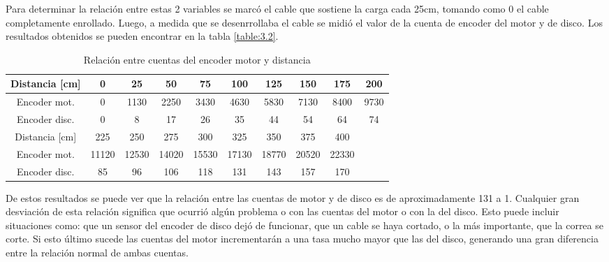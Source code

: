 Para determinar la relación entre estas 2 variables se marcó el cable que sostiene la carga cada 25cm, tomando como 0 el cable completamente enrollado. Luego, a medida que se desenrrollaba el cable se midió el valor de la cuenta de encoder del motor y de disco. Los resultados obtenidos se pueden encontrar en la tabla \ref{table:3.2}.

\begin{table}[!ht]
	\begin{center}
		
		\begin{tabular}{|c|c|c|c|c|c|c|c|c|c|}
			\hline
			\rowcolor{OODlightblue}
			Distancia [cm] & 0 & 25 & 50 & 75 & 100 & 125 & 150 & 175 & 200  \\
			\hline
			Encoder mot. & 0 & 1130 & 2250 & 3430 & 4630 & 5830 & 7130 & 8400 & 9730 \\
			\hline
			Encoder disc. & 0 & 8 & 17 & 26 & 35 & 44 & 54 & 64 & 74 \\ 
			\hline \hline
			\rowcolor{OODlightblue}
			Distancia [cm]  & 225 & 250 & 275 & 300 & 325 & 350 & 375 & 400 & \\
			\hline
			Encoder mot. & 11120 & 12530 & 14020 & 15530 & 17130 & 18770 & 20520 & 22330 & \\
			\hline 
			Encoder disc. & 85 & 96 & 106 & 118 & 131 & 143 & 157 & 170 & \\ 
			\hline
		\end{tabular}
	\end{center}
	\caption{Relación entre cuentas del encoder motor y distancia}
	\label{table:\thetable}
\end{table}

De estos resultados se puede ver que la relación entre las cuentas de motor y de disco es de aproximadamente 131 a 1. Cualquier gran desviación de esta relación significa que ocurrió algún problema o con las cuentas del motor o con la del disco. Esto puede incluir situaciones como: que un sensor del encoder de disco dejó de funcionar, que un cable se haya cortado, o la más importante, que la correa se corte. Si esto último sucede las cuentas del motor incrementarán a una tasa mucho mayor que las del disco, generando una gran diferencia entre la relación normal de ambas cuentas.

